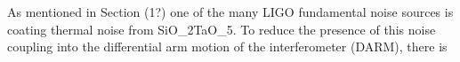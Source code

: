 As mentioned in Section (1?) one of the many LIGO fundamental noise sources is coating thermal noise from SiO_{2}TaO_{5}. To reduce the presence of this noise coupling into the differential arm motion of the interferometer (DARM), there is
